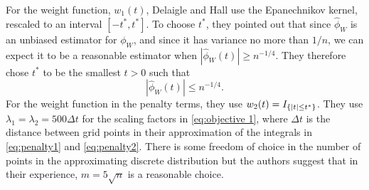 	For the weight function, $w_1(t)$, Delaigle and Hall \cite{Delaigle2016-la} use the Epanechnikov kernel, rescaled to an interval $[-t^*, t^*]$. To choose $t^*$, they pointed out that since $\hat{\phi}_W$ is an unbiased estimator for $\phi_W$, and since it has variance no more than $1/n$, we can expect it to be a reasonable estimator when $|\hat{\phi}_W(t)| \geq n^{-1/4}$. They therefore chose $t^*$ to be the smallest $t > 0$ such that 
	\begin{equation}
	\label{eq:define t star}
		\left|\hat{\phi}_W(t)\right| \leq n^{-1/4}.
	\end{equation}
	For the weight function in the penalty terms, they use $w_2(t) = I_{\{|t| \leq t^*\}}$. They use $\lambda_1 = \lambda_2 = 500 \Delta t$ for the scaling factors in \eqref{eq:objective 1}, where $\Delta t$ is the distance between grid points in their approximation of the integrals in \eqref{eq:penalty1} and \eqref{eq:penalty2}.
	There is some freedom of choice in the number of points in the approximating discrete distribution but the authors suggest that in their experience, $m = 5\sqrt{n}$ is a reasonable choice.



